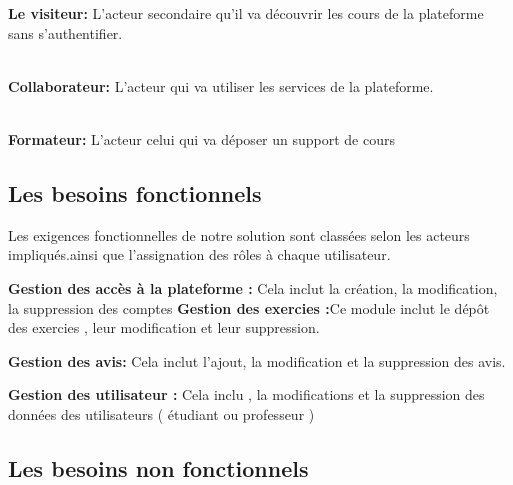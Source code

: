\textbf{Le visiteur:} L’acteur secondaire qu’il va découvrir les cours de la plateforme sans s’authentifier.


\\ \textbf{Collaborateur:} L’acteur qui va utiliser les services de la plateforme.


\\ \textbf{Formateur:} L'acteur celui qui va déposer un support de cours


\subsection{Les besoins fonctionnels}
Les exigences fonctionnelles de notre solution sont classées selon les acteurs
impliqués.ainsi que l'assignation des rôles à chaque utilisateur.


\textbf{Gestion des accès à la plateforme :} Cela inclut la création, la modification, la suppression des comptes
\textbf{Gestion des exercies :}Ce module inclut le dépôt des exercies , leur modification et leur suppression.

 
\textbf{Gestion des avis:}  Cela inclut l'ajout, la modification et la suppression des avis.   

\vspace{9mm}

\textbf{Gestion des utilisateur :} Cela inclu , la modifications et la suppression des données des utilisateurs ( étudiant ou professeur ) 




\subsection{Les besoins non fonctionnels}

